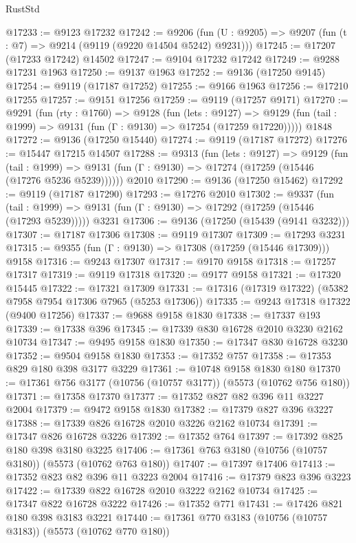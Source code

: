 \begin{lexlean}{RustStd}
\begin{coremodule}
@17233 := @9123 @17232
@17242 := @9206
    (fun (U : @9205) => @9207 (fun (t : @7) => @9214 (@9119 (@9220 @14504 @5242) @9231)))
@17245 := @17207 (@17233 @17242) @14502
@17247 := @9104 @17232 @17242
@17249 := @9288 @17231 @1963
@17250 := @9137 @1963
@17252 := @9136 (@17250 @9145)
@17254 := @9119 (@17187 @17252)
@17255 := @9166 @1963
@17256 := @17210 @17255
@17257 := @9151 @17256
@17259 := @9119 (@17257 @9171)
@17270 := @9291
    (fun (rty : @1760) =>
    @9128
      (fun (lets : @9127) =>
      @9129 (fun (tail : @1999) => @9131 (fun (Γ : @9130) => @17254 (@17259 @17220)))))
    @1848
@17272 := @9136 (@17250 @15440)
@17274 := @9119 (@17187 @17272)
@17276 := @15447 @17215 @14507
@17288 := @9313
    (fun (lets : @9127) =>
    @9129
      (fun (tail : @1999) =>
      @9131 (fun (Γ : @9130) => @17274 (@17259 (@15446 (@17276 @5236 @5239))))))
    @2010
@17290 := @9136 (@17250 @15462)
@17292 := @9119 (@17187 @17290)
@17293 := @17276 @2010
@17302 := @9337
    (fun (tail : @1999) => @9131 (fun (Γ : @9130) => @17292 (@17259 (@15446 (@17293 @5239)))))
    @3231
@17306 := @9136 (@17250 (@15439 (@9141 @3232)))
@17307 := @17187 @17306
@17308 := @9119 @17307
@17309 := @17293 @3231
@17315 := @9355 (fun (Γ : @9130) => @17308 (@17259 (@15446 @17309))) @9158
@17316 := @9243 @17307
@17317 := @9170 @9158
@17318 := @17257 @17317
@17319 := @9119 @17318
@17320 := @9177 @9158
@17321 := @17320 @15445
@17322 := @17321 @17309
@17331 := @17316 (@17319 @17322) (@5382 @7958 @7954 @17306 @7965 (@5253 @17306))
@17335 := @9243 @17318 @17322 (@9400 @17256)
@17337 := @9688 @9158 @1830
@17338 := @17337 @193
@17339 := @17338 @396
@17345 := @17339 @830 @16728 @2010 @3230 @2162 @10734
@17347 := @9495 @9158 @1830
@17350 := @17347 @830 @16728 @3230
@17352 := @9504 @9158 @1830
@17353 := @17352 @757
@17358 := @17353 @829 @180 @398 @3177 @3229
@17361 := @10748 @9158 @1830 @180
@17370 := @17361 @756 @3177 (@10756 (@10757 @3177)) (@5573 (@10762 @756 @180))
@17371 := @17358 @17370
@17377 := @17352 @827 @82 @396 @11 @3227 @2004
@17379 := @9472 @9158 @1830
@17382 := @17379 @827 @396 @3227
@17388 := @17339 @826 @16728 @2010 @3226 @2162 @10734
@17391 := @17347 @826 @16728 @3226
@17392 := @17352 @764
@17397 := @17392 @825 @180 @398 @3180 @3225
@17406 := @17361 @763 @3180 (@10756 (@10757 @3180)) (@5573 (@10762 @763 @180))
@17407 := @17397 @17406
@17413 := @17352 @823 @82 @396 @11 @3223 @2004
@17416 := @17379 @823 @396 @3223
@17422 := @17339 @822 @16728 @2010 @3222 @2162 @10734
@17425 := @17347 @822 @16728 @3222
@17426 := @17352 @771
@17431 := @17426 @821 @180 @398 @3183 @3221
@17440 := @17361 @770 @3183 (@10756 (@10757 @3183)) (@5573 (@10762 @770 @180))

\end{coremodule}
\end{lexlean}
